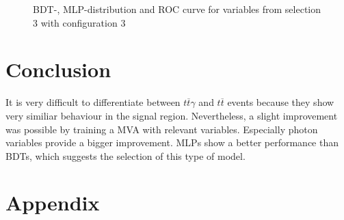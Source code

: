 \documentclass[11pt]{scrartcl}
\begin{document}
\begin{figure}[H]
	\caption{BDT-, MLP-distribution and ROC curve for variables from selection 3 with configuration 3}
	 \label{fig:ROC_s3_config3}	
	\end{figure}
				
\section{Conclusion}
It is very difficult to differentiate between $t\overline{t}\gamma$ and $t\overline{t}$ events because they show very similiar behaviour in the signal region. Nevertheless, a slight improvement was possible by training a MVA with relevant variables. Especially photon variables provide a bigger improvement. MLPs show a better performance than BDTs, which suggests the selection of this type of model.

\appendix
\section{Appendix}
\end{document}
